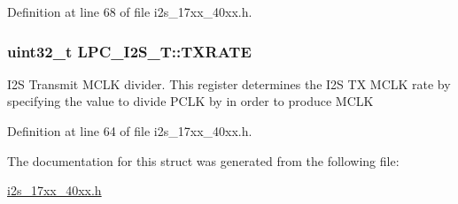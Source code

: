 Definition at line 68 of file i2s\+\_\+17xx\+\_\+40xx.\+h.

\subsubsection[{\texorpdfstring{T\+X\+R\+A\+TE}{TXRATE}}]{ uint32\+\_\+t L\+P\+C\+\_\+\+I2\+S\+\_\+\+T\+::\+T\+X\+R\+A\+TE}\hypertarget{structLPC__I2S__T_ab62a8a48830412bcf4cec1b1ed5a5b21}{}\label{structLPC__I2S__T_ab62a8a48830412bcf4cec1b1ed5a5b21}
I2S Transmit M\+C\+LK divider. This register determines the I2S TX M\+C\+LK rate by specifying the value to divide P\+C\+LK by in order to produce M\+C\+LK 

Definition at line 64 of file i2s\+\_\+17xx\+\_\+40xx.\+h.



The documentation for this struct was generated from the following file\+:\begin{DoxyCompactItemize}
\item 
\hyperlink{i2s__17xx__40xx_8h}{i2s\+\_\+17xx\+\_\+40xx.\+h}\end{DoxyCompactItemize}
